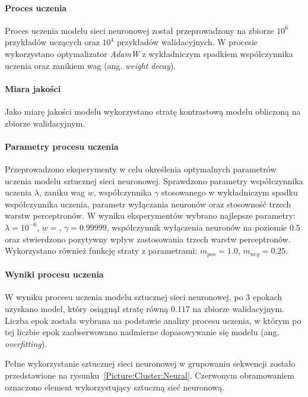             \paragraph{Proces uczenia}
                Proces uczenia modelu sieci neuronowej został przeprowadzony na zbiorze $10^{6}$ przykładów uczących oraz $10^{4}$ przykładów walidacyjnych.
                W procesie wykorzystano optymalizator \textit{AdamW}\cite{Loshchilov2017DecoupledWD} z wykładniczym spadkiem współczynnika uczenia oraz zanikiem wag (ang. \textit{weight decay}).

            \paragraph{Miara jakości}
                Jako miarę jakości modelu wykorzystano stratę kontrastową modelu obliczoną na zbiorze walidacyjnym.

            \paragraph{Parametry procesu uczenia}
                Przeprowadzono eksperymenty w celu określenia optymalnych parametrów uczenia modelu sztucznej sieci neuronowej. Sprawdzono parametry współczynnika uczenia $\lambda$, zaniku wag $w$, współczynnika $\gamma$ stosowanego w wykładniczym spadku współczynnika uczenia, parametr wyłączania neuronów oraz stosowność trzech warstw perceptronów. W wyniku eksperymentów wybrano najlepsze parametry: $\lambda = 10^{-6}$, $w = $, $\gamma=0.99999$, współczynnik wyłączenia neuronów na poziomie $0.5$ oraz stwierdzono pozytywny wpływ zastosowania trzech warstw perceptronów.
                Wykorzystano również funkcję straty z parametrami: $m_{pos} = 1.0$, $m_{neg} = 0.25$.

            \paragraph{Wyniki procesu uczenia}

                W wyniku procesu uczenia modelu sztucznej sieci neuronowej, po 3 epokach uzyskano model, który osiągnął stratę równą $0.117$ na zbiorze walidacyjnym. Liczba epok została wybrana na podstawie analizy procesu uczenia, w którym po tej liczbie epok zaobserwowano nadmierne dopasowywanie się modelu (ang. \textit{overfitting}).


            Pełne wykorzystanie sztucznej sieci neuronowej w grupowaniu sekwencji zostało przedstawione na rysunku~\ref{Picture:Cluster:Neural}. Czerwonym obramowaniem oznaczono element wykorzystujący sztuczną sieć neuronową.

